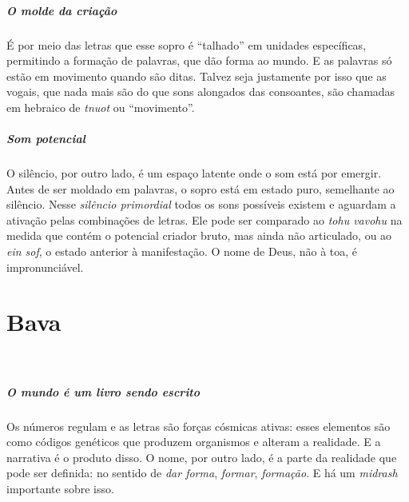 \paragraph{O molde da criação} É por meio das letras que esse sopro é ``talhado'' em unidades específicas, permitindo a formação de palavras, que dão forma ao mundo. E as palavras só estão em movimento quando são ditas. Talvez seja justamente por isso que as vogais, que nada mais são do que sons alongados das consoantes, são chamadas em hebraico de \textit{tnuot} ou ``movimento''.

\paragraph{Som potencial} O silêncio, por outro lado, é um espaço latente onde o som está por emergir. Antes de ser moldado em palavras, o sopro está em estado puro, semelhante ao silêncio. Nesse \textit{silêncio primordial} todos os sons possíveis existem e aguardam a ativação pelas combinações de letras. Ele pode ser comparado ao \textit{tohu vavohu} na medida que contém o potencial criador bruto, mas ainda não articulado, ou ao \textit{ein sof}, o estado anterior à manifestação. O nome de Deus, não à toa, é impronunciável.

\chapter*{Bava 
\smallskip{}}

\begin{center}
{\huge{}}\\\medskip{\footnotesize\formularlight{
\lipsum[2]
}}
\end{center}

\paragraph{O mundo é um livro sendo escrito} Os números regulam e as letras são forças cósmicas ativas: esses elementos são como códigos genéticos que produzem organismos e alteram a realidade. E a narrativa é o produto disso. O nome, por outro lado, é a parte da realidade que pode ser definida: no sentido de \textit{dar forma}, \textit{formar}, \textit{formação}. E há um \textit{midrash} importante sobre isso.

